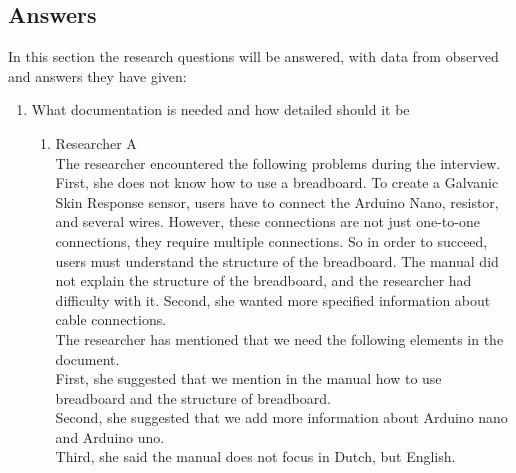 \documentclass[conference]{IEEEtran}
\begin{document}
	\subsection{Answers}
		In this section the research questions will be answered, with data from observed and answers they have given:
		\begin{enumerate}
			\item What documentation is needed and how detailed should it be
				\begin{enumerate}
					\item Researcher A\\
						The researcher encountered the following problems during the interview.\\

						First, she does not know how to use a breadboard. To create a Galvanic Skin Response sensor, users have to connect the Arduino Nano, resistor, and several wires. However, these connections are not just one-to-one connections, they require multiple connections. So in order to succeed, users must understand the structure of the breadboard. The manual did not explain the structure of the breadboard, and the researcher had difficulty with it. Second, she wanted more specified information about cable connections.\\
						The researcher has mentioned that we need the following elements in the document.\\
						First, she suggested that we mention in the manual how to use breadboard and the structure of breadboard. \\
						Second, she suggested that we add more information about Arduino nano and Arduino uno.\\
						Third, she said the manual does not focus in Dutch, but English. \\		
						

\end{enumerate}
\end{enumerate}
\end{document}
